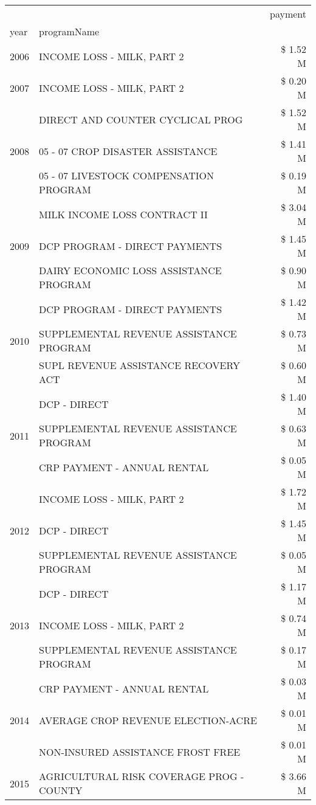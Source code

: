 \begin{tabular}{llr}
\toprule
 &  & payment \\
year & programName &  \\
\midrule
2006 & INCOME LOSS - MILK, PART 2 & \$ 1.52 M \\
\cline{1-3}
2007 & INCOME LOSS - MILK, PART 2 & \$ 0.20 M \\
\cline{1-3}
\multirow[t]{3}{*}{2008} & DIRECT AND COUNTER CYCLICAL PROG & \$ 1.52 M \\
 & 05 - 07 CROP DISASTER ASSISTANCE & \$ 1.41 M \\
 & 05 - 07 LIVESTOCK COMPENSATION PROGRAM & \$ 0.19 M \\
\cline{1-3}
\multirow[t]{3}{*}{2009} & MILK INCOME LOSS CONTRACT II & \$ 3.04 M \\
 & DCP PROGRAM - DIRECT PAYMENTS & \$ 1.45 M \\
 & DAIRY ECONOMIC LOSS ASSISTANCE PROGRAM & \$ 0.90 M \\
\cline{1-3}
\multirow[t]{3}{*}{2010} & DCP PROGRAM - DIRECT PAYMENTS & \$ 1.42 M \\
 & SUPPLEMENTAL REVENUE ASSISTANCE PROGRAM & \$ 0.73 M \\
 & SUPL REVENUE ASSISTANCE RECOVERY ACT & \$ 0.60 M \\
\cline{1-3}
\multirow[t]{3}{*}{2011} & DCP - DIRECT & \$ 1.40 M \\
 & SUPPLEMENTAL REVENUE ASSISTANCE PROGRAM & \$ 0.63 M \\
 & CRP PAYMENT - ANNUAL RENTAL & \$ 0.05 M \\
\cline{1-3}
\multirow[t]{3}{*}{2012} & INCOME LOSS - MILK, PART 2 & \$ 1.72 M \\
 & DCP - DIRECT & \$ 1.45 M \\
 & SUPPLEMENTAL REVENUE ASSISTANCE PROGRAM & \$ 0.05 M \\
\cline{1-3}
\multirow[t]{3}{*}{2013} & DCP - DIRECT & \$ 1.17 M \\
 & INCOME LOSS - MILK, PART 2 & \$ 0.74 M \\
 & SUPPLEMENTAL REVENUE ASSISTANCE PROGRAM & \$ 0.17 M \\
\cline{1-3}
\multirow[t]{3}{*}{2014} & CRP PAYMENT - ANNUAL RENTAL & \$ 0.03 M \\
 & AVERAGE CROP REVENUE ELECTION-ACRE & \$ 0.01 M \\
 & NON-INSURED ASSISTANCE FROST FREE & \$ 0.01 M \\
\cline{1-3}
\multirow[t]{2}{*}{2015} & AGRICULTURAL RISK COVERAGE PROG - COUNTY & \$ 3.66 M \\

\end{tabular}
